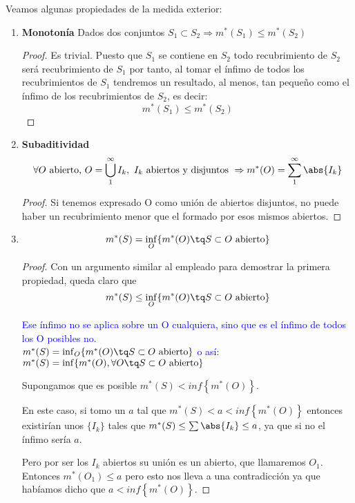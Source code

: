 \documentclass{apuntes}
\begin{document}
Veamos algunas propiedades de la medida exterior:
\begin{enumerate}
%
\item \textbf{Monotonía} Dados dos conjuntos $S_1 \subset S_2 \Rightarrow m^*(S_1) \leq m^*(S_2)$
\begin{proof}
Es trivial. Puesto que $S_1$ se contiene en $S_2$ todo recubrimiento de $S_2$ será recubrimiento de $S_1$ por tanto, al tomar el ínfimo de todos los recubrimientos de $S_1$ tendremos un resultado, al menos, tan pequeño como el ínfimo de los recubrimientos de $S_2$, es decir:
\[m^*(S_1) \leq m^*(S_2)\]
\end{proof}

%
\item \textbf{Subaditividad}
\[\forall O \text{ abierto, } O = \bigcup_{1}^{\infty}I_k, \ I_k \text{ abiertos y disjuntos } \Rightarrow m^*(O)=\sum_{1}^{\infty}\abs{I_k}\]
\begin{proof}
Si tenemos expresado O como unión de abiertos disjuntos, no puede haber un recubrimiento menor que el formado por esos mismos abiertos.
\end{proof}

%
\item \[ m^*(S) = \inf_O \lbrace m^*(O)\tq S \subset O \text{ abierto} \rbrace \]
\begin{proof}
Con un argumento similar al empleado para demostrar la primera propiedad, queda claro que
\[ m^*(S) \leq \inf_O \lbrace m^*(O)\tq S \subset O \text{ abierto} \rbrace \]

\textcolor{blue}{Ese  ínfimo no se aplica sobre un O cualquiera, sino que es el ínfimo de todos los O posibles no.\\
$ m^*(S) = \inf_O \lbrace m^*(O)\tq S \subset O \text{ abierto} \rbrace$ o así:\\
$ m^*(S) = \inf \lbrace m^*(O), \forall O \tq S \subset O \text{ abierto} \rbrace$
}

Supongamos que es posible $m^*(S) < inf\left\{m^*(O)\right\}$.

En este caso, si tomo un $a$ tal que $ m^*(S) < a < inf\left\{ m^*(O)\right\}$ entonces existirían unos $\lbrace I_k\rbrace$ tales que $m^*(S) \leq \sum \abs{I_k} \leq a$, ya que si no el ínfimo sería $a$.

Pero por ser los $I_k$ abiertos su unión es un abierto, que llamaremos $O_1$. Entonces $m^*(O_1) \leq a$ pero esto nos lleva a una contradicción ya que habíamos dicho que $a < inf\left\{m^*(O)\right\}$.


\end{proof}
\end{enumerate}
\end{document}
